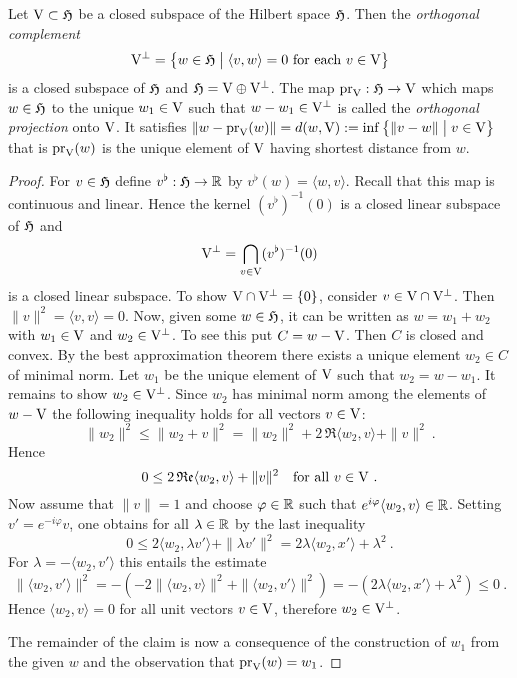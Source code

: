 \begin{thmanddef} 
\label{thm:orthogonal-decomposition-theorem}
Let $\mathrm{V} \subset \mathfrak{H}$ be a closed subspace of the Hilbert space $\mathfrak{H}$. Then the 
\emph{orthogonal complement}
\[
  \mathrm{V}^\bot = \big\{ w \in \mathfrak{H} \bigm\vert \langle v,w \rangle = 0 \text{ for each } v \in \mathrm{V} \big\}
\]
is a closed subspace of $\mathfrak{H}$ and $\mathfrak{H} = \mathrm{V} \oplus \mathrm{V}^\bot$. 
The map $\operatorname{pr}_{\mathrm{V}} : \mathfrak{H} \to \mathrm{V}$ which maps $w \in \mathfrak{H}$ to the unique $w_1\in \mathrm{V}$ 
such that $w - w_1 \in   \mathrm{V}^\bot$ is called the \emph{orthogonal projection} onto $\mathrm{V}$.
It satisfies $\left\| w-  \operatorname{pr}_{\mathrm{V}} (w)\right\| = d(w,\mathrm{V}) := \inf \big\{ \| v-w \| \bigm\vert v\in \mathrm{V} \big\}$ that is $\operatorname{pr}_{\mathrm{V}} (w)$ is the unique element of $\mathrm{V}$ having shortest distance from $w$.  
\end{thmanddef}
\begin{proof}
For $v \in \mathfrak{H}$ define $v^\flat :\mathfrak{H} \to \mathbb{R}$ by $v^\flat (w) = \langle w,v \rangle$. Recall that this map is 
continuous and linear. Hence the kernel $(v^\flat)^{-1}(0)$ is a closed linear subspace of $\mathfrak{H}$ and 
\[
  \mathrm{V}^{\bot} = \bigcap_{v \in \mathrm{V}} (v^\flat)^{-1}(0)
\]
is a closed linear subspace. To show $\mathrm{V} \cap \mathrm{V}^\bot = \{0\}$, consider 
$v \in \mathrm{V} \cap \mathrm{V}^\bot$. Then $\|v \|^2 = \langle v,v \rangle = 0$. 
Now, given some $w \in \mathfrak{H}$, it can be written as $w = w_1 + w_2$ with 
$w_1 \in \mathrm{V}$ and $w_2 \in \mathrm{V}^\bot$. To see this put $C = w - \mathrm{V}$. Then $C$ is closed and convex. 
By the best approximation theorem there exists a unique element $w_2 \in C$ of minimal norm. Let  $w_1$
be the unique element of $\mathrm{V}$ such that $w_2 = w -w_1$. It remains to show $w_2 \in \mathrm{V}^\bot$. 
Since $w_2$ has minimal norm among the elements of $w-\mathrm{V}$ the following inequality holds for all 
vectors $v \in \mathrm{V}$:
\[
\|w_2 \|^2 \leq \| w_2 + v \|^2 = \|w_2 \|^2 + 2\, \Re\langle w_2,v\rangle + \| v \|^2 \ . 
\]
Hence
\[
0 \leq 2\, \mathfrak{Re}\langle w_2,v\rangle + \| v \|^2 \quad \text{for all  } v \in \mathrm{V}  \ .
\]
Now assume that $\|v\|=1$ and choose $\varphi \in \mathbb{R}$ such that $e^{i\varphi}\langle w_2, v \rangle \in \mathbb{R}$.
Setting $v' = e^{-i\varphi}v$, one obtains for all $\lambda \in \mathbb{R}$ by the last inequality
\[
  0 \leq 2 \langle w_2,\lambda v'\rangle + \| \lambda v' \|^2 = 
  2\lambda\langle w_2, x'\rangle + \lambda^2\ .
\]
For $\lambda = -\langle w_2, v' \rangle$ this entails  the estimate
\[ 
   \| \langle w_2, v' \rangle \|^2 = 
   - \left( - 2\|\langle w_2,v \rangle \|^2 + \| \langle w_2, v' \rangle \|^2 \right) = - \left(  2\lambda\langle w_2, x'\rangle + \lambda^2 \right) \leq 0 \ .
\]
Hence $\langle w_2, v \rangle = 0$ for all unit vectors $v \in \mathrm{V}$, therefore $w_2 \in \mathrm{V}^\bot$.

The remainder of the claim is now a consequence of the construction of $w_1$ from the given $w$ and the 
observation that $\operatorname{pr}_{\mathrm{V}} (w) = w_1$. 
\end{proof}


